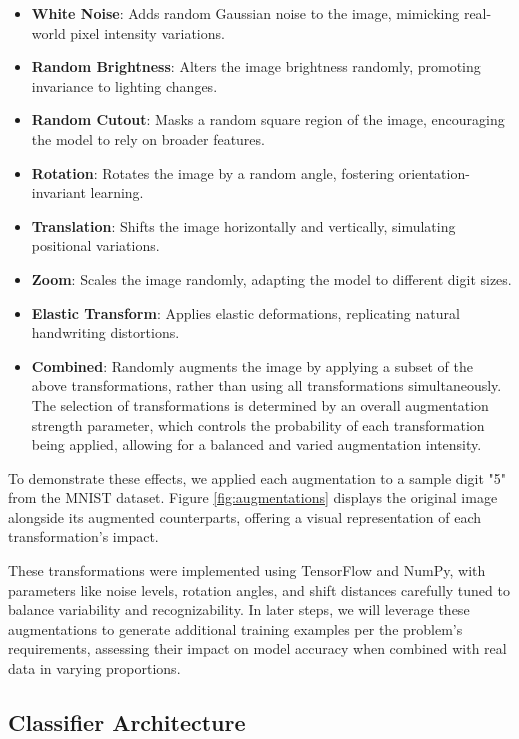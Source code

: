 \documentclass[12pt]{article}
\begin{document}
\begin{itemize}
    \item \textbf{White Noise}: Adds random Gaussian noise to the image, mimicking real-world pixel intensity variations.
    \item \textbf{Random Brightness}: Alters the image brightness randomly, promoting invariance to lighting changes.
    \item \textbf{Random Cutout}: Masks a random square region of the image, encouraging the model to rely on broader features.
    \item \textbf{Rotation}: Rotates the image by a random angle, fostering orientation-invariant learning.
    \item \textbf{Translation}: Shifts the image horizontally and vertically, simulating positional variations.
    \item \textbf{Zoom}: Scales the image randomly, adapting the model to different digit sizes.
    \item \textbf{Elastic Transform}: Applies elastic deformations, replicating natural handwriting distortions.
    \item \textbf{Combined}: Randomly augments the image by applying a subset of the above transformations, rather than using all transformations simultaneously. The selection of transformations is determined by an overall augmentation strength parameter, which controls the probability of each transformation being applied, allowing for a balanced and varied augmentation intensity.
\end{itemize}

To demonstrate these effects, we applied each augmentation to a sample digit "5" from the MNIST dataset. Figure \ref{fig:augmentations} displays the original image alongside its augmented counterparts, offering a visual representation of each transformation’s impact.

These transformations were implemented using TensorFlow and NumPy, with parameters like noise levels, rotation angles, and shift distances carefully tuned to balance variability and recognizability. In later steps, we will leverage these augmentations to generate additional training examples per the problem’s requirements, assessing their impact on model accuracy when combined with real data in varying proportions.

\subsection{Classifier Architecture}
\end{document}
